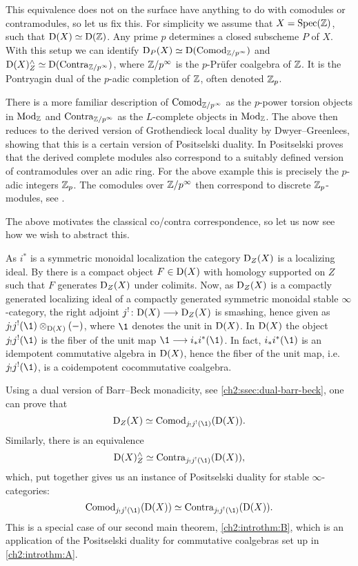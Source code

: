 This equivalence does not on the surface have anything to do with comodules or contramodules, so let us fix this. For simplicity we assume that $X = \operatorname{Spec}(\mathbb{Z})$, such that $\mathrm{D}(X)\simeq \mathrm{D}(\mathbb{Z})$. Any prime $p$ determines a closed subscheme $P$ of $X$. With this setup we can identify $\mathrm{D}_P(X) \simeq \mathrm{D}(\mathrm{Comod}_{\mathbb{Z}/p^\infty})$ and $\mathrm{D}(X)^\wedge_Z\simeq \mathrm{D}(\mathrm{Contra}_{\mathbb{Z}/p^\infty})$, where $\mathbb{Z}/p^\infty$ is the $p$-Prüfer coalgebra of $\mathbb{Z}$. It is the Pontryagin dual of the $p$-adic completion of $\mathbb{Z}$, often denoted $\mathbb{Z}_p$. 

\begin{introrm}
    There is a more familiar description of $\mathrm{Comod}_{\mathbb{Z}/p^\infty}$ as the $p$-power torsion objects in $\mathrm{Mod}_{\mathbb{Z}}$ and $\mathrm{Contra}_{\mathbb{Z}/p^\infty}$ as the $L$-complete objects in $\mathrm{Mod}_{\mathbb{Z}}$. The above then reduces to the derived version of Grothendieck local duality by Dwyer--Greenlees, showing that this is a certain version of Positselski duality. In \cite[2.2(1), 2.2(3)]{positselski_2017_abelian} Positselski proves that the derived complete modules also correspond to a suitably defined version of contramodules over an adic ring. For the above example this is precisely the $p$-adic integers $\mathbb{Z}_p$. The comodules over $\mathbb{Z}/p^\infty$ then correspond to discrete $\mathbb{Z}_p$-modules, see \cite[Sec. 1.9, Sec. 1.10]{positselski_2022_contramodules}. 
\end{introrm}


The above motivates the classical co/contra correspondence, so let us now see how we wish to abstract this.  

As $i^*$ is a symmetric monoidal localization the category $\mathrm{D}_Z(X)$ is a localizing ideal. By \cite[6.8]{rouquier_2008} there is a compact object $F\in \mathrm{D}(X)$ with homology supported on $Z$ such that $F$ generates $\mathrm{D}_Z(X)$ under colimits. Now, as $\mathrm{D}_Z(X)$ is a compactly generated localizing ideal of a compactly generated symmetric monoidal stable $\infty$-category, the right adjoint $j^!\colon \mathrm{D}(X)\longrightarrow \mathrm{D}_Z(X)$ is smashing, hence given as $j_! j^!(\1)\otimes_{\Der(X)} (-)$, where $\1$ denotes the unit in $\mathrm{D}(X)$. In $\mathrm{D}(X)$ the object $j_! j^! (\1)$ is the fiber of the unit map $\1\to i_* i^* (\1)$. In fact, $i_* i^* (\1)$ is an idempotent commutative algebra in $\mathrm{D}(X)$, hence the fiber of the unit map, i.e. $j_! j^!(\1)$, is a coidempotent cocommutative coalgebra. 

Using a dual version of Barr--Beck monadicity, see \cref{ch2:ssec:dual-barr-beck}, one can prove that 
\[\Der_Z(X)\simeq \Comod_{j_! j^! (\1)}(\Der(X)).\] 
Similarly, there is an equivalence 
\[\Der(X)^\wedge_Z \simeq \Contra_{j_! j^! (\1)}(\Der(X)),\]
which, put together gives us an instance of Positselski duality for stable $\infty$-categories:
\[\Comod_{j_! j^! (\1)}(\Der(X)) \simeq \Contra_{j_! j^! (\1)}(\Der(X)).\]
This is a special case of our second main theorem, \cref{ch2:introthm:B}, which is an application of the Positselski duality for commutative coalgebras  set up in \cref{ch2:introthm:A}. 
 

